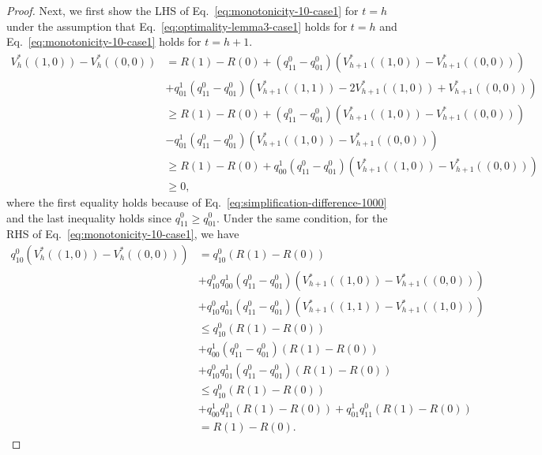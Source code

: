 \begin{proof}
Next, we first show the LHS of Eq.~\eqref{eq:monotonicity-10-case1} for $t=h$ under the assumption that Eq.~\eqref{eq:optimality-lemma3-case1} holds for $t=h$ and Eq.~\eqref{eq:monotonicity-10-case1} holds for $t=h+1$.
\begin{align*}
    V_{h}^*\left((1,0)\right)-V_h^*\left((0,0)\right)&=R(1)-R(0)+\left(q^0_{11}-q^0_{01}\right)\left(V_{h+1}^*\left((1,0)\right)-V_{h+1}^*\left((0,0)\right)\right)\\
    &+q^1_{01}\left(q^0_{11}-q^0_{01}\right)\left(V_{h+1}^*\left((1,1)\right)-2V_{h+1}^*\left((1,0)\right)+V_{h+1}^*\left((0,0)\right)\right)\\
    &\geq R(1)-R(0)+\left(q^0_{11}-q^0_{01}\right)\left(V_{h+1}^*\left((1,0)\right)-V_{h+1}^*\left((0,0)\right)\right)\\
    &-q^1_{01}\left(q^0_{11}-q^0_{01}\right)\left(V_{h+1}^*\left((1,0)\right)-V_{h+1}^*\left((0,0)\right)\right)\\
    &\geq R(1)-R(0)+q^1_{00}\left(q^0_{11}-q^0_{01}\right)\left(V_{h+1}^*\left((1,0)\right)-V_{h+1}^*\left((0,0)\right)\right)\\
    &\geq 0,
\end{align*}
where the first equality holds because of Eq.~\eqref{eq:simplification-difference-1000} and the last inequality holds since $q^0_{11}\geq q^0_{01}$. Under the same condition, for the RHS of Eq.~\eqref{eq:monotonicity-10-case1}, we have
\begin{align*}
    q^0_{10}\left(V_{h}^*\left((1,0)\right)-V_h^*\left((0,0)\right)\right)&=q^0_{10}(R(1)-R(0))\\
    &+q^0_{10}q^1_{00}\left(q^0_{11}-q^0_{01}\right)\left(V_{h+1}^*\left((1,0)\right)-V_{h+1}^*\left((0,0)\right)\right)\\
    &+q^0_{10}q^1_{01}\left(q^0_{11}-q^0_{01}\right)\left(V_{h+1}^*\left((1,1)\right)-V_{h+1}^*\left((1,0)\right)\right)\\
    &\leq q^0_{10}(R(1)-R(0))\\
    &+q^1_{00}\left(q^0_{11}-q^0_{01}\right)(R(1)-R(0))\\
    &+q^0_{10}q^1_{01}\left(q^0_{11}-q^0_{01}\right)(R(1)-R(0))\\
    &\leq   q^0_{10}(R(1)-R(0))\\&+q^1_{00}q^0_{11}(R(1)-R(0))+q^1_{01}q^0_{11}(R(1)-R(0))\\
    &=R(1)-R(0).
\end{align*}


\end{proof}

